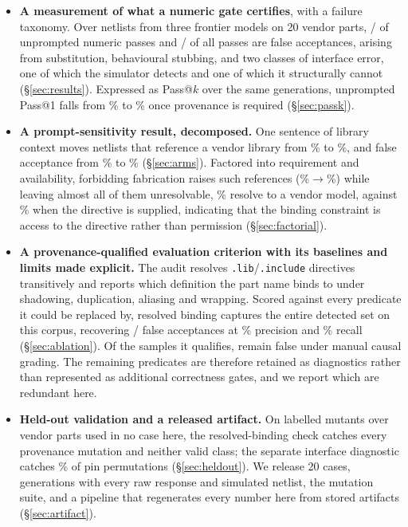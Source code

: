 \begin{itemize}
  \item \textbf{A measurement of what a numeric gate certifies}, with a
    failure taxonomy. Over \NumNetlists{} netlists from three frontier models
    on 20 vendor parts, \BareFalse{}/\BarePasses{} of unprompted numeric
    passes and \FalseAcceptTotal{}/\NumNumericPass{} of all passes are false
    acceptances, arising from substitution, behavioural stubbing, and two
    classes of interface error, one of which the simulator detects and one of
    which it structurally cannot (\S\ref{sec:results}). Expressed as Pass@$k$
    over the same generations, unprompted Pass@1 falls from
    \PassOneBareNumeric{}\% to \PassOneBareProv{}\% once provenance is
    required (\S\ref{sec:passk}).
  \item \textbf{A prompt-sensitivity result, decomposed.} One sentence of
    library context moves netlists that reference a vendor library from
    \BareGenuineRate{}\% to \LibGenuineRate{}\%, and false acceptance from
    \BareFalseRate{}\% to \LibFalseRate{}\% (\S\ref{sec:arms}). Factored into
    requirement and availability, forbidding fabrication raises such
    references (\FactBareRefRate{}\%$\to$\FactRequirementRefRate{}\%) while
    leaving almost all of them unresolvable, \FactRequirementResRate{}\%
    resolve to a vendor model, against \FactLibraryResRate{}\% when the
    directive is supplied, indicating that the binding constraint is access to the
    directive rather than permission (\S\ref{sec:factorial}).
  \item \textbf{A provenance-qualified evaluation criterion with its
    baselines and limits made explicit.} The audit resolves
    \texttt{.lib}/\texttt{.include} directives
    transitively and reports which definition the part name binds to under
    shadowing, duplication, aliasing and wrapping. Scored against every
    predicate it could be replaced by, resolved binding captures the entire
    detected set on this corpus, recovering
    \ProvTP{}/\FalseAcceptTotal{} false acceptances at
    \ProvPrecision{}\% precision and \ProvRecall{}\% recall
    (\S\ref{sec:ablation}). Of the \StageProvAccepted{} samples it qualifies,
    \ProvFN{} remain false under manual causal grading. The remaining
    predicates are therefore retained as diagnostics rather than represented
    as additional correctness gates, and we report which are redundant here.
  \item \textbf{Held-out validation and a released artifact.} On \MutTotal{}
    labelled mutants over \MutParts{} vendor parts used in no case here, the
    resolved-binding check catches every provenance mutation and neither valid
    class; the separate interface diagnostic catches
    \MutPinPermuteRate{}\% of pin permutations
    (\S\ref{sec:heldout}). We release 20 cases,
    \CorpusTotal{} generations with every raw response and simulated netlist,
    the mutation suite, and a pipeline that regenerates every number here from
    stored artifacts (\S\ref{sec:artifact}).
\end{itemize}

